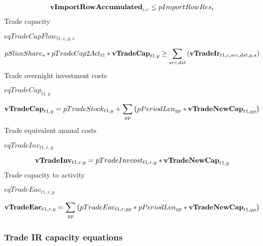 \documentclass{article}
\begin{document}
\begin{dmath} 
{\bf vImportRowAccumulated}_{i,c}  \le  pImportRowRes_{i}
\end{dmath} 
Trade capacity







$eqTradeCapFlow_{t1,c,y,s}$





\begin{dmath} 
pSliceShare_{s}*pTradeCap2Act_{t1}*{\bf vTradeCap}_{t1,y}  \ge  \sum_{src,dst}{\left({\bf vTradeIr}_{t1,c,src,dst,y,s}\right)}
\end{dmath} 
Trade overnight investment costs







$eqTradeCap_{t1,y}$





\begin{dmath} 
{\bf vTradeCap}_{t1,y}  =  pTradeStock_{t1,y}+\sum_{yp}{\left(pPeriodLen_{yp}*{\bf vTradeNewCap}_{t1,yp}\right)}
\end{dmath} 
Trade equivalent annual costs







$eqTradeInv_{t1,r,y}$





\begin{dmath} 
{\bf vTradeInv}_{t1,r,y}  =  pTradeInvcost_{t1,r,y}*{\bf vTradeNewCap}_{t1,y}
\end{dmath} 
Trade capacity to activity







$eqTradeEac_{t1,r,y}$





\begin{dmath} 
{\bf vTradeEac}_{t1,r,y}  =  \sum_{yp}{\left(pTradeEac_{t1,r,yp}*pPeriodLen_{yp}*{\bf vTradeNewCap}_{t1,yp}\right)}
\end{dmath} 
\subsubsection*{Trade IR capacity equations}
\end{document}
